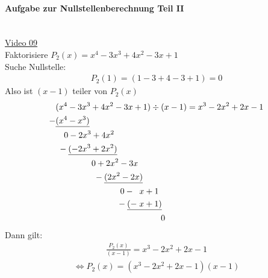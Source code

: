 \paragraph{Aufgabe zur Nullstellenberechnung Teil II}$  $\vspace*{3mm}\\
\href{https://youtu.be/iHXUOPQJfgM}{Video 09}\\
Faktorisiere $ P_2(x)=x^4-3x^3+4x^2-3x+1$\\
Suche Nullstelle:\\
\begin{align*}
P_2(1)=(1-3+4-3+1)=0
\end{align*}
Also ist $ (x-1) $ teiler von $ P_2(x) $\\
\begin{align*}
&(x^4-3x^3+4x^2-3x+1)\div(x-1)=x^3-2x^2+2x-1\\
-&\underline{(x^4-x^3)}\\
&\hspace{0.35cm}0-2x^3+4x^2\\
&\hspace{0.10cm}-\underline{(-2x^3+2x^2)}\\
&\hspace{1.5cm}0+2x^2-3x\\
&\hspace{1.6cm}-\underline{(2x^2-2x)}\\
&\hspace{2.7cm}0-\;\;x+1\\
&\hspace{2.56cm}-\underline{(-\;x+1)}\\
&\hspace{4.4cm}0\\
\end{align*}
Dann gilt:\\
\begin{align*}
\frac{P_2(x)}{(x-1)}=x^3-2x^2+2x-1
\end{align*}
\begin{align*}
\Leftrightarrow P_2(x)=(x^3-2x^2+2x-1)(x-1)\\
\end{align*}
